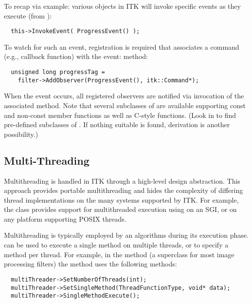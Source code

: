 To recap via example: various objects in ITK will invoke specific events
as they execute (from ):
\small
\begin{verbatim}
  this->InvokeEvent( ProgressEvent() );
\end{verbatim}
\normalsize

To watch for such an event, registration is required that associates a
command (e.g., callback function) with the event:
 method:
\small
\begin{verbatim}
  unsigned long progressTag = 
    filter->AddObserver(ProgressEvent(), itk::Command*);
\end{verbatim}
\normalsize

When the event occurs, all registered observers are notified via invocation
of the associated  method. Note that several
subclasses of  are available supporting const and
non-const member functions as well as C-style functions. (Look in
 to find pre-defined subclasses of
. If nothing suitable is found, derivation is another
possibility.)

\subsection{Multi-Threading}
\label{sec:MultiThreading}

Multithreading is handled in ITK through a high-level design
abstraction. This approach provides portable multithreading and hides the
complexity of differing thread implementations on the many systems supported
by ITK. For example, the class  provides support for
multithreaded execution using  on an SGI, or
 on any platform supporting POSIX threads. 

Multithreading is typically employed by an algorithms during its execution
phase.  can be used to execute a single method on
multiple threads, or to specify a method per thread. For example, in the 
method  (a superclass for most image processing filters)
the  method uses the following methods:

\begin{verbatim}
  multiThreader->SetNumberOfThreads(int);
  multiThreader->SetSingleMethod(ThreadFunctionType, void* data);
  multiThreader->SingleMethodExecute();
\end{verbatim}

